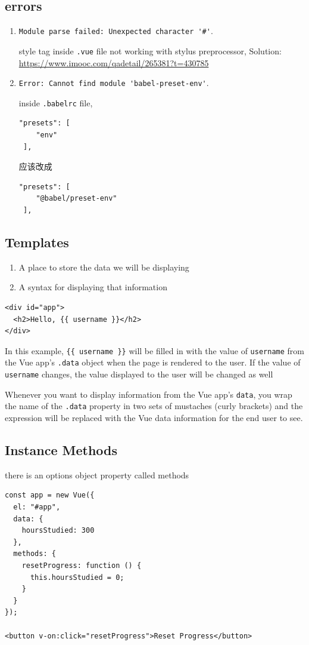 \documentclass[a4paper, 12pt]{article}
\begin{document}
\subsection{errors}
\begin{enumerate}
\item 
\verb|Module parse failed: Unexpected character '#'|. 

style tag inside \verb|.vue| file not working with stylus preprocessor, Solution: \url{https://www.imooc.com/qadetail/265381?t=430785}

\item \verb|Error: Cannot find module 'babel-preset-env'|. 

inside \verb|.babelrc| file, 
\begin{verbatim}
"presets": [
    "env"
 ],
\end{verbatim}

应该改成
\begin{verbatim}
"presets": [
    "@babel/preset-env"
 ],
\end{verbatim}

\end{enumerate}

\subsection{Templates}
\begin{enumerate}
\item A place to store the data we will be displaying
\item A syntax for displaying that information
\end{enumerate}

\begin{verbatim}
<div id="app">
  <h2>Hello, {{ username }}</h2>
</div>
\end{verbatim}

In this example, \verb|{{ username }}| will be filled in with the value of \verb|username| from the Vue app's \verb|.data| object when the page is rendered to the user. If the value of \verb|username| changes, the value displayed to the user will be changed as well

Whenever you want to display information from the Vue app's \verb|data|, you wrap the name of the \verb|.data| property in two sets of mustaches (curly brackets) and the expression will be replaced with the Vue data information for the end user to see.

\subsection{Instance Methods}
there is an options object property called methods
\begin{verbatim}
const app = new Vue({
  el: "#app",
  data: {
    hoursStudied: 300
  },
  methods: {
    resetProgress: function () {
      this.hoursStudied = 0;
    }
  }
});

<button v-on:click="resetProgress">Reset Progress</button>
\end{verbatim}
\end{document}

